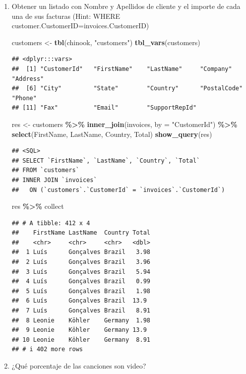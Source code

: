 \documentclass[
]{book}
\newenvironment{Shaded}{\begin{snugshade}}{\end{snugshade}}
\newcommand{\AttributeTok}[1]{\textcolor[rgb]{0.13,0.29,0.53}{#1}}
\newcommand{\FunctionTok}[1]{\textcolor[rgb]{0.13,0.29,0.53}{\textbf{#1}}}
\newcommand{\NormalTok}[1]{#1}
\newcommand{\OtherTok}[1]{\textcolor[rgb]{0.56,0.35,0.01}{#1}}
\newcommand{\SpecialCharTok}[1]{\textcolor[rgb]{0.81,0.36,0.00}{\textbf{#1}}}
\newcommand{\StringTok}[1]{\textcolor[rgb]{0.31,0.60,0.02}{#1}}
\begin{document}
\begin{enumerate}
\def\labelenumi{\arabic{enumi}.}
\setcounter{enumi}{3}
\item
  Obtener un listado con Nombre y Apellidos de cliente y el importe de cada una de sus facturas
  (Hint: WHERE customer.CustomerID=invoices.CustomerID)

\begin{Shaded}
\begin{Highlighting}[]
\NormalTok{customers }\OtherTok{\textless{}{-}} \FunctionTok{tbl}\NormalTok{(chinook, }\StringTok{"customers"}\NormalTok{)}
\FunctionTok{tbl\_vars}\NormalTok{(customers) }
\end{Highlighting}
\end{Shaded}

\begin{verbatim}
## <dplyr:::vars>
##  [1] "CustomerId"   "FirstName"    "LastName"     "Company"      "Address"     
##  [6] "City"         "State"        "Country"      "PostalCode"   "Phone"       
## [11] "Fax"          "Email"        "SupportRepId"
\end{verbatim}

\begin{Shaded}
\begin{Highlighting}[]
\NormalTok{res }\OtherTok{\textless{}{-}}\NormalTok{ customers }\SpecialCharTok{\%\textgreater{}\%} \FunctionTok{inner\_join}\NormalTok{(invoices, }\AttributeTok{by =} \StringTok{"CustomerId"}\NormalTok{) }\SpecialCharTok{\%\textgreater{}\%} \FunctionTok{select}\NormalTok{(FirstName, LastName, Country, Total) }
\FunctionTok{show\_query}\NormalTok{(res)}
\end{Highlighting}
\end{Shaded}

\begin{verbatim}
## <SQL>
## SELECT `FirstName`, `LastName`, `Country`, `Total`
## FROM `customers`
## INNER JOIN `invoices`
##   ON (`customers`.`CustomerId` = `invoices`.`CustomerId`)
\end{verbatim}

\begin{Shaded}
\begin{Highlighting}[]
\NormalTok{res  }\SpecialCharTok{\%\textgreater{}\%}\NormalTok{ collect}
\end{Highlighting}
\end{Shaded}

\begin{verbatim}
## # A tibble: 412 x 4
##    FirstName LastName  Country Total
##    <chr>     <chr>     <chr>   <dbl>
##  1 Luís      Gonçalves Brazil   3.98
##  2 Luís      Gonçalves Brazil   3.96
##  3 Luís      Gonçalves Brazil   5.94
##  4 Luís      Gonçalves Brazil   0.99
##  5 Luís      Gonçalves Brazil   1.98
##  6 Luís      Gonçalves Brazil  13.9 
##  7 Luís      Gonçalves Brazil   8.91
##  8 Leonie    Köhler    Germany  1.98
##  9 Leonie    Köhler    Germany 13.9 
## 10 Leonie    Köhler    Germany  8.91
## # i 402 more rows
\end{verbatim}
\item
  ¿Qué porcentaje de las canciones son video?


\end{enumerate}
\end{document}
